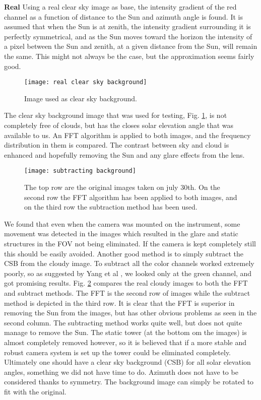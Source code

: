 \documentclass[]{book}
\begin{document}
		\textbf{Real}
		Using a real clear sky image as base, the intensity gradient of the red channel as a function of distance to the Sun and azimuth angle is found. It is assumed that when the Sun is at zenith, the intensity gradient surrounding it is perfectly symmetrical, and as the Sun moves toward the horizon the intensity of a pixel between the Sun and zenith, at a given distance from the Sun, will remain the same. This might not always be the case, but the approximation seems fairly good.
		
		\begin{figure} [ht]
			\centering
			\texttt{[image: real clear sky background]}
			\caption{Image used as clear sky background.}
			\label{fig: real clear sky background}
		\end{figure}

		The clear sky background image that was used for testing, Fig. \ref{fig: real clear sky background}, is not completely free of clouds, but has the closes solar elevation angle that was available to us. An FFT algorithm is applied to both images, and the frequency distribution in them is compared.
		The contrast between sky and cloud is enhanced and hopefully removing the Sun and any glare effects from the lens.
		
		\begin{figure} [h]
			\centering
			\texttt{[image: subtracting background]}
			\caption{The top row are the original images taken on july 30th. On the second row the FFT
				algorithm has been applied to both images, and on the third row the subtraction method has been
				used.}
			\label{fig: subtracting background}
		\end{figure}
	
		We found that even when the camera was mounted on the instrument, some movement was detected in the images which resulted in the glare and static structures in the FOV not being eliminated. If the camera is kept completely still this should be easily avoided. Another good method is to simply subtract the CSB from the cloudy image. To subtract all the color channels worked extremely poorly, so as suggested by Yang et al \cite{amt-9-587-2016}, we looked only at the green channel, and got promising results.
		Fig. \ref{fig: subtracting background} compares the real cloudy images to both the FFT and subtract methods. The FFT is the second row of images while the subtract method is depicted in the third row. It is clear that the FFT is superior in removing the Sun from the images, but has other obvious problems as seen in the second column. The subtracting method works quite well, but does not quite manage to remove the Sun. The static tower (at the bottom om the images) is almost completely removed however, so it is believed that if a more stable and robust camera system is set up the tower could be eliminated completely.
		Ultimately one should have a clear sky background (CSB) for all solar elevation angles, something we did not have time to do. Azimuth does not have to be considered thanks to symmetry. The background image can simply be rotated to fit with the original.
\end{document}
